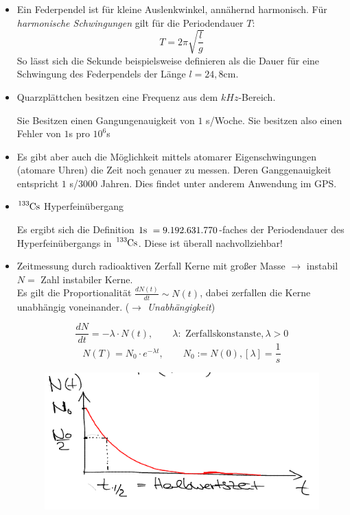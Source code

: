 \begin{Beispiel}
\begin{itemize}
\item Ein Federpendel ist für kleine Auslenkwinkel, annähernd harmonisch.  Für \emph{harmonische Schwingungen} gilt für die Periodendauer $T$:
\[
\boxed{T=2\pi \sqrt{\frac{l}{g}}}
\]
So lässt sich die Sekunde beispielsweise definieren als die  Dauer für eine Schwingung des Federpendels der Länge $l=24,8 \text{cm}$.
\item Quarzplättchen besitzen eine Frequenz aus dem $kHz$-Bereich.

Sie Besitzen einen Gangungenauigkeit von $1$ s/Woche. Sie besitzen also einen Fehler von $1$s pro $10^6$s
\item Es gibt aber auch die Möglichkeit mittels atomarer Eigenschwingungen (atomare Uhren) die Zeit noch genauer zu messen.  Deren Ganggenauigkeit entspricht $1$ s/$3000$ Jahren. Dies findet unter anderem Anwendung im GPS. 
\item $\ce{^{133}Cs}$ Hyperfeinübergang

Es ergibt sich die Definition $1\text{s }=9.192.631.770$-faches der Periodendauer des Hyperfeinübergangs in $\ce{^{133}Cs}$. Diese ist überall nachvollziehbar!
\item Zeitmessung durch radioaktiven Zerfall Kerne mit großer Masse $\rightarrow$ instabil $N=$ Zahl instabiler Kerne. \\

Es gilt die Proportionalität $\frac{dN(t)}{dt} \sim N(t) $, dabei zerfallen die Kerne unabhängig voneinander. ($\rightarrow$ \emph{Unabhängigkeit}) 

 \begin{equation*}
  \frac{dN}{dt}=-\lambda \cdot N(t), \qquad \lambda: \text{ Zerfallskonstanste}, \lambda>0
 \end{equation*}
 \begin{equation*}
  N(T)=N_0 \cdot e^{-\lambda t}, \qquad N_0:= N(0), [\lambda]=\frac{1}{s}
 \end{equation*}

  \begin{figure}[ht]
   \includegraphics[scale=0.5]{bilder/fig6}
  \end{figure}


\end{itemize}
\end{Beispiel}
